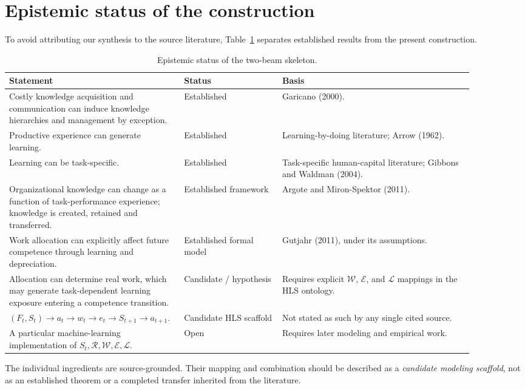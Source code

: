 \section{Epistemic status of the construction}

To avoid attributing our synthesis to the source literature, Table~\ref{tab:status} separates
established results from the present construction.

\begin{table}[ht]
\centering
\small
\begin{tabular}{p{0.30\linewidth}p{0.20\linewidth}p{0.39\linewidth}}
\toprule
Statement & Status & Basis\\
\midrule
Costly knowledge acquisition and communication can induce knowledge hierarchies and
management by exception.
& Established
& Garicano (2000).\\[2mm]

Productive experience can generate learning.
& Established
& Learning-by-doing literature; Arrow (1962).\\[2mm]

Learning can be task-specific.
& Established
& Task-specific human-capital literature; Gibbons and Waldman (2004).\\[2mm]

Organizational knowledge can change as a function of task-performance experience; knowledge
is created, retained and transferred.
& Established framework
& Argote and Miron-Spektor (2011).\\[2mm]

Work allocation can explicitly affect future competence through learning and depreciation.
& Established formal model
& Gutjahr (2011), under its assumptions.\\[2mm]

Allocation can determine real work, which may generate task-dependent learning exposure
entering a competence transition.
& Candidate / hypothesis
& Requires explicit \(\mathcal W\), \(\mathcal E\), and \(\mathcal L\) mappings in the HLS ontology.\\[2mm]

\((F_t,S_t)\to a_t\to w_t\to e_t\to S_{t+1}\to a_{t+1}\).
& Candidate HLS scaffold
& Not stated as such by any single cited source.\\[2mm]

A particular machine-learning implementation of \(S_t,\mathcal R,\mathcal W,\mathcal E,\mathcal L\).
& Open
& Requires later modeling and empirical work.\\
\bottomrule
\end{tabular}
\caption{Epistemic status of the two-beam skeleton.}
\label{tab:status}
\end{table}

The individual ingredients are source-grounded. Their mapping and combination should be
described as a \emph{candidate modeling scaffold}, not as an established theorem or a
completed transfer inherited from the literature.
